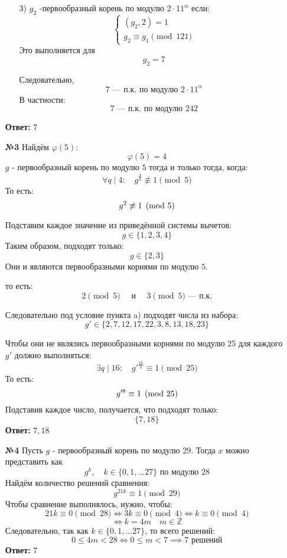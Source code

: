 \documentclass[a4paper]{article}
\renewcommand{\f}[2]{\frac{#1}{#2}}
\newcommand{\case}[1]{\begin{cases} #1 \end{cases}}
\renewcommand{\phi}{\varphi}
\newcommand{\lr}{\Leftrightarrow}
\renewcommand{\leq}{\leqslant}
\newcommand{\ZZ}{\mathbb{Z}}
\newcommand{\divides}{\;|\;}
\begin{document}
\begin{enumerate}
\begin{enumerate}
        \item[3)] $g_2$ -первообразный корень по модулю $2\cdot 11^\alpha$ если:
        $$\case{
            (g_2, 2) = 1\\
            g_2 \equiv g_1 \pmod{121}
        }$$
        Это выполняется для $$g_2 = 7$$

        Следовательно, 
        $$7 \text{ --- п.к. по модулю } 2\cdot11^\alpha$$
        В частности:
        $$7 \text{ --- п.к. по модулю } 242$$
    \end{enumerate}
    \textbf{Ответ:} $ 7 $\\

    \item[\textbf{№3}]Найдём $\phi(5)$:
    $$\phi(5) = 4$$
    $g$ - первообразный корень по модулю $5$ тогда и только тогда, когда:
    $$\forall q \divides 4: \quad  g^{\f{4}{q}} \not \equiv 1 \pmod{5}$$
    То есть:
    $$g^{2} \not \equiv 1 \pmod{ 5}\\$$

    Подставим каждое значение из приведённой системы вычетов:
    $$g \in \{1, 2, 3, 4\}$$
    Таким образом, подходят только:
    $$g \in \{2, 3\}$$
    Они и являются первообразными корнями по модулю $5$.

    то есть:
    $$2\pmod{5} \quad \text{ и }\quad  3\pmod{5} \text{ --- п.к.}$$

    Следовательно под условие пункта a) подходят числа из набора:
    $$g' \in \{2, 7, 12, 17, 22, 3, 8, 13, 18, 23\}$$

    Чтобы они не являлись первообразными корнями по модулю 25 для каждого $g'$ должно выполняться:
    $$\exists q \divides 16: \quad  g'^{\f{16}{q}} \equiv 1 \pmod{25}$$
    То есть:
    $$g'^{8}  \equiv 1 \pmod{25}\\$$
    Подставив каждое число, получается, что подходят только:
    $$\{7, 18\}$$
    \textbf{Ответ: } $7, 18$\\


    \item[\textbf{№4}]Пусть $g$ - первообразный корень по модулю 29. Тогда $x$ можно представить как 
    $$g^k,\quad  k\in \{0, 1, \dots 27\} \text{ по модулю 28}$$
    Найдём количество решений сравнения:
    $$g^{21k} \equiv 1 \pmod{29}$$
    Чтобы сравнение выполнялось, нужно, чтобы:
    $$21k \equiv 0 \pmod{28} \lr 3k \equiv 0 \pmod{4} \lr k \equiv 0 \pmod{4} $$
    $$\lr k = 4m \quad m \in \ZZ$$
    Следовательно, так как $k\in \{0, 1, \dots 27\}$, то всего решений:
    $$0 \leq 4m < 28 \lr 0 \leq m < 7 \implies \text{7 решений}$$
    \textbf{Ответ:} $7$\\


\end{enumerate}
\end{document}
